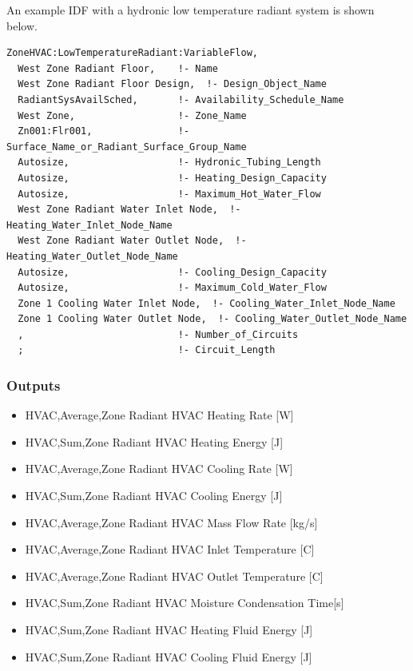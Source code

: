 An example IDF with a hydronic low temperature radiant system is shown below.

\begin{lstlisting}
ZoneHVAC:LowTemperatureRadiant:VariableFlow,
  West Zone Radiant Floor,    !- Name
  West Zone Radiant Floor Design,  !- Design_Object_Name
  RadiantSysAvailSched,       !- Availability_Schedule_Name
  West Zone,                  !- Zone_Name
  Zn001:Flr001,               !- Surface_Name_or_Radiant_Surface_Group_Name
  Autosize,                   !- Hydronic_Tubing_Length
  Autosize,                   !- Heating_Design_Capacity
  Autosize,                   !- Maximum_Hot_Water_Flow
  West Zone Radiant Water Inlet Node,  !- Heating_Water_Inlet_Node_Name
  West Zone Radiant Water Outlet Node,  !- Heating_Water_Outlet_Node_Name
  Autosize,                   !- Cooling_Design_Capacity
  Autosize,                   !- Maximum_Cold_Water_Flow
  Zone 1 Cooling Water Inlet Node,  !- Cooling_Water_Inlet_Node_Name
  Zone 1 Cooling Water Outlet Node,  !- Cooling_Water_Outlet_Node_Name
  ,                           !- Number_of_Circuits
  ;                           !- Circuit_Length
\end{lstlisting}


\subsubsection{Outputs}\label{outputs-5-007}

\begin{itemize}
\item
  HVAC,Average,Zone Radiant HVAC Heating Rate {[}W{]}
\item
  HVAC,Sum,Zone Radiant HVAC Heating Energy {[}J{]}
\item
  HVAC,Average,Zone Radiant HVAC Cooling Rate {[}W{]}
\item
  HVAC,Sum,Zone Radiant HVAC Cooling Energy {[}J{]}
\item
  HVAC,Average,Zone Radiant HVAC Mass Flow Rate {[}kg/s{]}
\item
  HVAC,Average,Zone Radiant HVAC Inlet Temperature {[}C{]}
\item
  HVAC,Average,Zone Radiant HVAC Outlet Temperature {[}C{]}
\item
  HVAC,Sum,Zone Radiant HVAC Moisture Condensation Time{[}s{]}
\item
  HVAC,Sum,Zone Radiant HVAC Heating Fluid Energy {[}J{]}
\item
  HVAC,Sum,Zone Radiant HVAC Cooling Fluid Energy {[}J{]}
\end{itemize}

